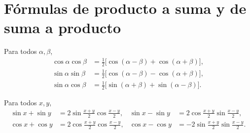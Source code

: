 \addtocounter{definicion}{1}%

\section{Fórmulas de producto a suma y de suma a producto}

\begin{proposicion}\label{prop:producto-suma}
Para todos $\alpha,\beta$,
\begin{align*}
\cos\alpha\cos\beta&=\tfrac12\bigl[\cos(\alpha-\beta)+\cos(\alpha+\beta)\bigr],\\
\sin\alpha\sin\beta&=\tfrac12\bigl[\cos(\alpha-\beta)-\cos(\alpha+\beta)\bigr],\\
\sin\alpha\cos\beta&=\tfrac12\bigl[\sin(\alpha+\beta)+\sin(\alpha-\beta)\bigr].
\end{align*}
\end{proposicion}

\begin{corolario}\label{cor:suma-producto}
Para todos $x,y$,
\begin{align*}
\sin x+\sin y&=2\sin\tfrac{x+y}{2}\cos\tfrac{x-y}{2}, & \sin x-\sin y&=2\cos\tfrac{x+y}{2}\sin\tfrac{x-y}{2},\\
\cos x+\cos y&=2\cos\tfrac{x+y}{2}\cos\tfrac{x-y}{2}, & \cos x-\cos y&=-2\sin\tfrac{x+y}{2}\sin\tfrac{x-y}{2}.
\end{align*}
\end{corolario}

\addtocounter{definicion}{1}%

\addtocounter{definicion}{1}%

